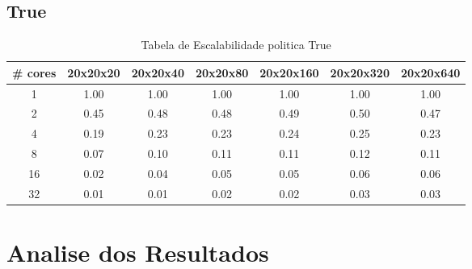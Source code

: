 \documentclass[a4paper, 12pt]{article}
\begin{document}
	
	\FloatBarrier
	
	\subsection{True}
	\begin{table}[h]
		\centering
		\begin{tabular}{|c|c|c|c|c|c|c|}
			\hline
			\textbf{\# cores} & \textbf{20x20x20} & \textbf{20x20x40} & \textbf{20x20x80} & \textbf{20x20x160} & \textbf{20x20x320} & \textbf{20x20x640} \\
			\hline
			1 & 1.00 & 1.00 & 1.00 & 1.00 & 1.00 & 1.00 \\
			\hline
			2 & 0.45 & 0.48 & 0.48 & 0.49 & 0.50 & 0.47 \\
			\hline
			4 & 0.19 & 0.23 & 0.23 & 0.24 & 0.25 & 0.23 \\
			\hline
			8 & 0.07 & 0.10 & 0.11 & 0.11 & 0.12 & 0.11 \\
			\hline
			16 & 0.02 & 0.04 & 0.05 & 0.05 & 0.06 & 0.06 \\
			\hline
			32 & 0.01 & 0.01 & 0.02 & 0.02 & 0.03 & 0.03 \\
			\hline
		\end{tabular}
		\caption{Tabela de Escalabilidade politica True}
	\end{table}
	
		\FloatBarrier
	
	\section{Analise dos Resultados}
	

	
	
	

	 
\end{document}
